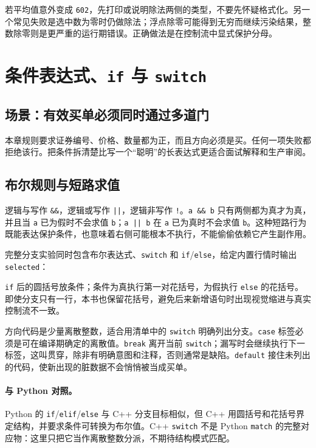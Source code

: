 若平均值意外变成 \texttt{602}，先打印或说明除法两侧的类型，不要先怀疑格式化。另一个常见失败是选中数为零时仍做除法；浮点除零可能得到无穷而继续污染结果，整数除零则是更严重的运行期错误。正确做法是在控制流中显式保护分母。

\section{条件表达式、\texttt{if} 与 \texttt{switch}}

\subsection{场景：有效买单必须同时通过多道门}

本章规则要求证券编号、价格、数量都为正，而且方向必须是买。任何一项失败都拒绝该行。把条件拆清楚比写一个“聪明”的长表达式更适合面试解释和生产审阅。

\subsection{布尔规则与短路求值}

逻辑与写作 \lstinline|&&|，逻辑或写作 \lstinline!||!，逻辑非写作 \texttt{!}。\lstinline|a && b| 只有两侧都为真才为真，并且当 \texttt{a} 已为假时不会求值 \texttt{b}；\lstinline!a || b! 在 \texttt{a} 已为真时不会求值 \texttt{b}。这种短路行为既能表达保护条件，也意味着右侧可能根本不执行，不能偷偷依赖它产生副作用。

完整分支实验同时包含布尔表达式、\texttt{switch} 和 \texttt{if}/\texttt{else}，给定内置行情时输出 \texttt{selected}：



\texttt{if} 后的圆括号放条件；条件为真执行第一对花括号，为假执行 \texttt{else} 的花括号。即使分支只有一行，本书也保留花括号，避免后来新增语句时出现视觉缩进与真实控制流不一致。

方向代码是少量离散整数，适合用清单中的 \texttt{switch} 明确列出分支。\texttt{case} 标签必须是可在编译期确定的离散值。\texttt{break} 离开当前 \texttt{switch}；漏写时会继续执行下一标签，这叫贯穿，除非有明确意图和注释，否则通常是缺陷。\texttt{default} 接住未列出的代码，使新出现的脏数据不会悄悄被当成买单。

\paragraph{与 Python 对照。}
Python 的 \texttt{if}/\texttt{elif}/\texttt{else} 与 C++ 分支目标相似，但 C++ 用圆括号和花括号界定结构，并要求条件可转换为布尔值。C++ \texttt{switch} 不是 Python \texttt{match} 的完整对应物：这里只把它当作离散整数分派，不期待结构模式匹配。

